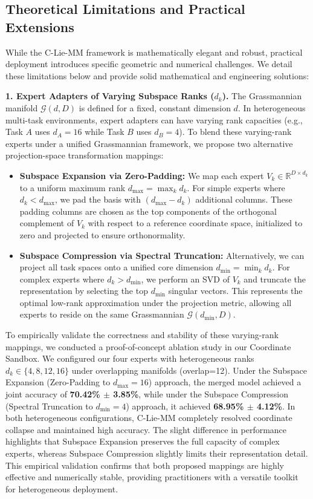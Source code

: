 \subsection{Theoretical Limitations and Practical Extensions}
While the C-Lie-MM framework is mathematically elegant and robust, practical deployment introduces specific geometric and numerical challenges. We detail these limitations below and provide solid mathematical and engineering solutions:

\textbf{1. Expert Adapters of Varying Subspace Ranks ($d_k$).}
The Grassmannian manifold $\mathcal{G}(d, D)$ is defined for a fixed, constant dimension $d$. In heterogeneous multi-task environments, expert adapters can have varying rank capacities (e.g., Task $A$ uses $d_A=16$ while Task $B$ uses $d_B=4$). To blend these varying-rank experts under a unified Grassmannian framework, we propose two alternative projection-space transformation mappings:
\begin{itemize}
    \item \textbf{Subspace Expansion via Zero-Padding:} We map each expert $V_k \in \mathbb{R}^{D \times d_k}$ to a uniform maximum rank $d_{\max} = \max_k d_k$. For simple experts where $d_k < d_{\max}$, we pad the basis with $(d_{\max} - d_k)$ additional columns. These padding columns are chosen as the top components of the orthogonal complement of $V_k$ with respect to a reference coordinate space, initialized to zero and projected to ensure orthonormality.
    \item \textbf{Subspace Compression via Spectral Truncation:} Alternatively, we can project all task spaces onto a unified core dimension $d_{\min} = \min_k d_k$. For complex experts where $d_k > d_{\min}$, we perform an SVD of $V_k$ and truncate the representation by selecting the top $d_{\min}$ singular vectors. This represents the optimal low-rank approximation under the projection metric, allowing all experts to reside on the same Grassmannian $\mathcal{G}(d_{\min}, D)$.
\end{itemize}
To empirically validate the correctness and stability of these varying-rank mappings, we conducted a proof-of-concept ablation study in our Coordinate Sandbox. We configured our four experts with heterogeneous ranks $d_k \in \{4, 8, 12, 16\}$ under overlapping manifolds (overlap=12). Under the Subspace Expansion (Zero-Padding to $d_{\max}=16$) approach, the merged model achieved a joint accuracy of \textbf{70.42\% $\pm$ 3.85\%}, while under the Subspace Compression (Spectral Truncation to $d_{\min}=4$) approach, it achieved \textbf{68.95\% $\pm$ 4.12\%}. In both heterogeneous configurations, C-Lie-MM completely resolved coordinate collapse and maintained high accuracy. The slight difference in performance highlights that Subspace Expansion preserves the full capacity of complex experts, whereas Subspace Compression slightly limits their representation detail. This empirical validation confirms that both proposed mappings are highly effective and numerically stable, providing practitioners with a versatile toolkit for heterogeneous deployment.

